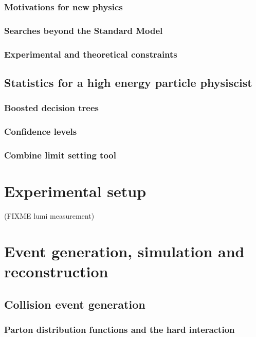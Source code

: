 \subsection{Motivations for new physics}
\subsection{Searches beyond the Standard Model}
\subsection{Experimental and theoretical constraints}
\section{Statistics for a high energy particle physiscist}
\subsection{Boosted decision trees}
\subsection{Confidence levels }
\subsection{Combine limit setting tool}

\chapter{Experimental setup}


(FIXME lumi measurement) %

\chapter{Event generation, simulation and reconstruction}
\section{Collision event generation}
\subsection{Parton distribution functions and the hard interaction}
